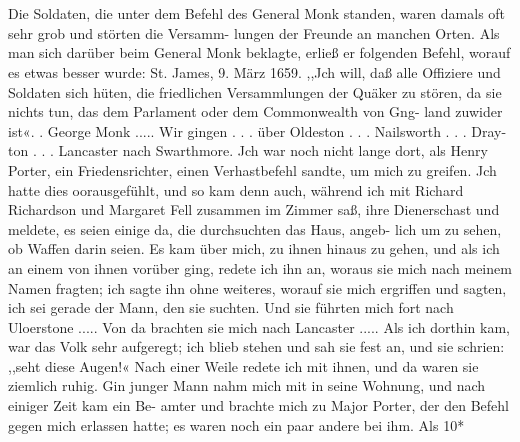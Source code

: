 \section{}

Die Soldaten, die unter dem Befehl des General Monk
standen, waren damals oft sehr grob und störten die Versamm-
lungen der Freunde an manchen Orten. Als man sich darüber
beim General Monk beklagte, erließ er folgenden Befehl, worauf
es etwas besser wurde:
St. James, 9. März 1659.
,,Jch will, daß alle Offiziere und Soldaten sich hüten, die
friedlichen Versammlungen der Quäker zu stören, da sie nichts
tun, das dem Parlament oder dem Commonwealth von Gng-
land zuwider ist«. . George Monk .....
Wir gingen . . . über Oldeston . . . Nailsworth . . . Dray-
ton . . . Lancaster nach Swarthmore. Jch war noch nicht lange
dort, als Henry Porter, ein Friedensrichter, einen Verhastbefehl
sandte, um mich zu greifen. Jch hatte dies oorausgefühlt, und
so kam denn auch, während ich mit Richard Richardson und
Margaret Fell zusammen im Zimmer saß, ihre Dienerschast und
meldete, es seien einige da, die durchsuchten das Haus, angeb-
lich um zu sehen, ob Waffen darin seien. Es kam über mich, zu
ihnen hinaus zu gehen, und als ich an einem von ihnen vorüber
ging, redete ich ihn an, woraus sie mich nach meinem Namen
fragten; ich sagte ihn ohne weiteres, worauf sie mich ergriffen
und sagten, ich sei gerade der Mann, den sie suchten. Und sie
führten mich fort nach Uloerstone ..... Von da brachten sie
mich nach Lancaster ..... Als ich dorthin kam, war das Volk
sehr aufgeregt; ich blieb stehen und sah sie fest an, und sie
schrien: ,,seht diese Augen!« Nach einer Weile redete ich mit
ihnen, und da waren sie ziemlich ruhig. Gin junger Mann nahm
mich mit in seine Wohnung, und nach einiger Zeit kam ein Be-
amter und brachte mich zu Major Porter, der den Befehl gegen
mich erlassen hatte; es waren noch ein paar andere bei ihm. Als
10*


